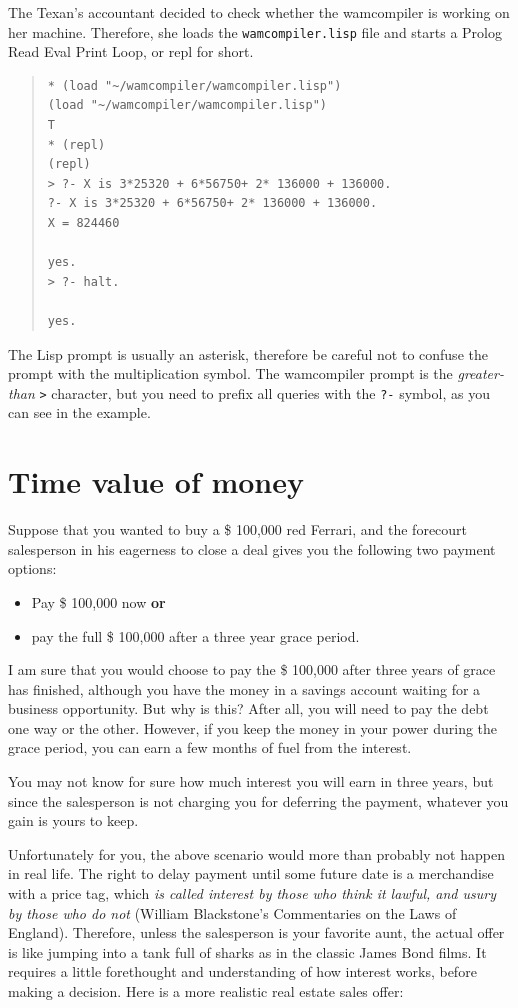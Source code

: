 \documentclass[a4paper,12pt]{book}
\begin{document}
The Texan's accountant decided to check whether
the wamcompiler is working on her machine. Therefore,
she loads the \verb|wamcompiler.lisp| file and
starts a Prolog Read Eval Print Loop, or repl for
short.
\begin{quote}
\begin{verbatim}
* (load "~/wamcompiler/wamcompiler.lisp")
(load "~/wamcompiler/wamcompiler.lisp")
T
* (repl)
(repl)
> ?- X is 3*25320 + 6*56750+ 2* 136000 + 136000.
?- X is 3*25320 + 6*56750+ 2* 136000 + 136000.
X = 824460

yes.
> ?- halt.

yes.
\end{verbatim}
\end{quote}

The Lisp prompt is usually an asterisk, therefore
be careful not to confuse the prompt with the
multiplication symbol. The wamcompiler prompt is
the {\em greater-than} \verb|>| character, but you need to prefix
all queries with the \verb|?-| symbol, as you
can see in the example.

\section{Time value of money}
Suppose that you wanted to buy a \$ 100,000 red Ferrari,
and the forecourt salesperson in his eagerness to
close a deal gives you the following two payment options:  
\begin{itemize}
\item Pay \$ 100,000 now {\bf or}
\item pay the full \$ 100,000 after a three year grace period.
\end{itemize}

I am sure that you would choose to pay the \$ 100,000 after
three years of grace has finished, although you have the
money in a savings account waiting for a business
opportunity. But why is this? After all, you will need
to pay the debt one way or the other. However, if you
keep the money in your power during the grace period,
you can earn a few months of fuel from the interest.

You may not know for sure how much interest you
will earn in three years, but since the salesperson
is not charging you for deferring the payment,
whatever you gain is yours to keep.

Unfortunately for you, the above scenario would
more than probably not happen in real life.
The right to delay payment until some future
date is a merchandise with a price tag,
which {\em is called interest by those who
think it lawful, and usury by those who
do not} (William Blackstone's Commentaries
on the Laws of England). Therefore, unless
the salesperson is your favorite aunt,
the actual offer is like jumping into a tank
full of sharks as in the classic James Bond films.
It requires a little forethought and understanding
of how interest works, before making a decision.
Here is a more realistic real estate sales offer:
\end{document}
